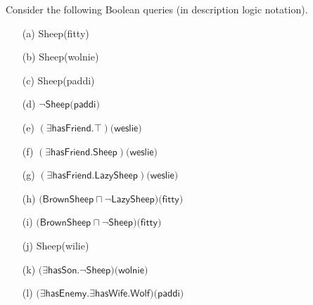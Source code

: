 \documentclass{article}
\begin{document}
Consider the following Boolean queries (in description logic notation).

\begin{itemize}
    \item[(a)] \textsf{Sheep(fitty)}
    \item[(b)] \textsf{Sheep(wolnie)}
    \item[(c)] \textsf{Sheep(paddi)}
    \item[(d)] $\neg\textsf{Sheep(paddi)}$
    \item[(e)] $(\exists\textsf{hasFriend.}\top)\textsf{(weslie)}$
    \item[(f)] $(\exists\textsf{hasFriend.Sheep})\textsf{(weslie)}$
    \item[(g)] $(\exists\textsf{hasFriend.LazySheep})\textsf{(weslie)}$
    \item[(h)] $(\textsf{BrownSheep}\sqcap\neg\textsf{LazySheep)(fitty)}$
    \item[(i)] $(\textsf{BrownSheep}\sqcap\neg\textsf{Sheep)(fitty)}$
    \item[(j)] \textsf{Sheep(wilie)}
    \item[(k)] $(\exists\textsf{hasSon.}\neg\textsf{Sheep)(wolnie)}$
    \item[(l)] $(\exists\textsf{hasEnemy.}\exists\textsf{hasWife.}\textsf{Wolf)(paddi)}$
\end{itemize}
\end{document}
